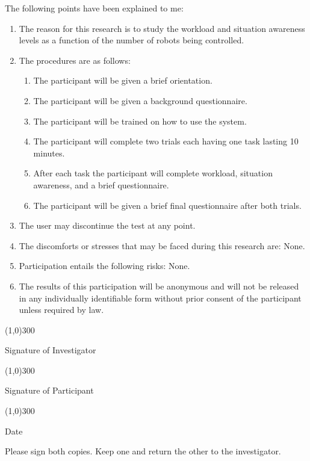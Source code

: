\documentclass[12pt,a4paper,twoside]{article}
\newcommand\liststyleWWviiiNumvii{%
\renewcommand\theenumi{\arabic{enumi}}
\renewcommand\theenumii{\alph{enumii}}
\renewcommand\theenumiii{\roman{enumiii}}
\renewcommand\theenumiv{\arabic{enumiv}}
\renewcommand\labelenumi{\theenumi.}
\renewcommand\labelenumii{\theenumii.}
\renewcommand\labelenumiii{\theenumiii.}
\renewcommand\labelenumiv{\theenumiv.}
}
\begin{document}

\bigskip

The following points have been explained to me:

\liststyleWWviiiNumvii
\begin{enumerate}
\item The reason for this research is to study the workload and situation awareness levels as a function of the number of robots being controlled.

\item The procedures are as follows:

\begin{enumerate}
\item The participant will be given a brief orientation.
\item The participant will be given a background questionnaire.
\item The participant will be trained on how to use the system.
\item The participant will complete two trials each having one task lasting 10 minutes.
\item After each task the participant will complete workload, situation awareness, and a brief questionnaire.
\item The participant will be given a brief final questionnaire after both trials.
\end{enumerate}

\item The user may discontinue the test at any point.

\item The discomforts or stresses that may be faced during this research are: None.

\item Participation entails the following risks: None.

\item The results of this participation will be anonymous and will not be released in any individually identifiable form without prior consent of the participant unless required by law.
\end{enumerate}

\bigskip

\line(1,0){300}

Signature of Investigator

\bigskip
\bigskip

\line(1,0){300}

Signature of Participant

\bigskip
\bigskip

\line(1,0){300}

Date

\bigskip

Please sign both copies. Keep one and return the other to the investigator.
\end{document}
